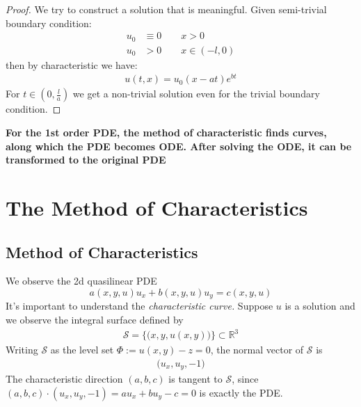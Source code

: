 \begin{exercise}
\begin{proof}
	We try to construct a solution that is meaningful. Given semi-trivial boundary condition:
	\begin{align*}
		u_0 &\equiv 0 \qquad x >0\\
		u_0 &> 0  \qquad x \in (-l, 0)
	\end{align*}
	then by characteristic we have:
	\begin{align*}
		u(t, x) = u_0(x - at) e^{bt}
	\end{align*}
	For $t \in (0, \frac{l}{a})$ we get a non-trivial solution even for the trivial boundary condition.
\end{proof}
\textbf{For the 1st order PDE, the method of characteristic finds curves, along which the PDE becomes ODE. After solving the ODE, it can be transformed to the original PDE}
\end{exercise}



\section{The Method of Characteristics}
\subsection{Method of Characteristics}
We observe the 2d quasilinear PDE
\begin{equation}
	a(x, y, u)u_x + b(x, y, u)u_y  = c(x, y, u)
\end{equation}
It's important to understand the \textit{characteristic curve.} Suppose $u$ is a solution and we observe the integral surface defined by
\begin{align*}
	\mathcal{S} = \bigg\{ \big(x, y, u(x, y) \big) \bigg\} \subset \mathbb{R}^3
\end{align*}
Writing $\mathcal{S}$ as the level set $\Phi := u(x,y) - z = 0$, the normal vector of $\mathcal{S}$ is
\begin{align*}
	\big(u_x , u_y , -1\big)
\end{align*}
The characteristic direction $(a, b, c)$ is tangent to $\mathcal{S}$, since $(a,b,c)\cdot(u_x, u_y, -1) = a u_x + b u_y - c = 0$ is exactly the PDE.


